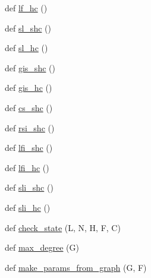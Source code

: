 \begin{DoxyCompactItemize}
def \hyperlink{namespacenetworkx_1_1algorithms_1_1coloring_1_1tests_1_1test__coloring_a0831d44853af497c6fdab07295efd9f3}{lf\+\_\+hc} ()
\item 
def \hyperlink{namespacenetworkx_1_1algorithms_1_1coloring_1_1tests_1_1test__coloring_a37929377423f61a0d020da257c01240c}{sl\+\_\+shc} ()
\item 
def \hyperlink{namespacenetworkx_1_1algorithms_1_1coloring_1_1tests_1_1test__coloring_ad7a5d91fd882a273e706bf005893e71a}{sl\+\_\+hc} ()
\item 
def \hyperlink{namespacenetworkx_1_1algorithms_1_1coloring_1_1tests_1_1test__coloring_a8668ff2167168632dae8dc618c9008de}{gis\+\_\+shc} ()
\item 
def \hyperlink{namespacenetworkx_1_1algorithms_1_1coloring_1_1tests_1_1test__coloring_a30db7b9f1c2a3da0ecaeac4c3db1efac}{gis\+\_\+hc} ()
\item 
def \hyperlink{namespacenetworkx_1_1algorithms_1_1coloring_1_1tests_1_1test__coloring_a13da32e4bffc7ca1fe5e1262a439b9eb}{cs\+\_\+shc} ()
\item 
def \hyperlink{namespacenetworkx_1_1algorithms_1_1coloring_1_1tests_1_1test__coloring_ab5b021045934534f12fba91923b965e9}{rsi\+\_\+shc} ()
\item 
def \hyperlink{namespacenetworkx_1_1algorithms_1_1coloring_1_1tests_1_1test__coloring_adfb51d9895ef3846584f449007663142}{lfi\+\_\+shc} ()
\item 
def \hyperlink{namespacenetworkx_1_1algorithms_1_1coloring_1_1tests_1_1test__coloring_ad9387db7f14b0cde51f923990c1abe2d}{lfi\+\_\+hc} ()
\item 
def \hyperlink{namespacenetworkx_1_1algorithms_1_1coloring_1_1tests_1_1test__coloring_af73f49c6d87b725f1856635a79f00d8c}{sli\+\_\+shc} ()
\item 
def \hyperlink{namespacenetworkx_1_1algorithms_1_1coloring_1_1tests_1_1test__coloring_a283c0b49f533ea0e34358a8598ae484d}{sli\+\_\+hc} ()
\item 
def \hyperlink{namespacenetworkx_1_1algorithms_1_1coloring_1_1tests_1_1test__coloring_ac2681f98ac86b7c8784fc8cfba8808f2}{check\+\_\+state} (L, N, H, F, C)
\item 
def \hyperlink{namespacenetworkx_1_1algorithms_1_1coloring_1_1tests_1_1test__coloring_a5837a44cf39f283248d5c927c667c47e}{max\+\_\+degree} (G)
\item 
def \hyperlink{namespacenetworkx_1_1algorithms_1_1coloring_1_1tests_1_1test__coloring_a5030cbfde2afba1a0ecaf4e6e5c793ce}{make\+\_\+params\+\_\+from\+\_\+graph} (G, F)
\end{DoxyCompactItemize}
